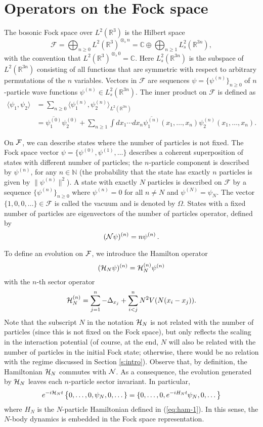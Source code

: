 \documentclass[11pt,a4paper]{article}
\newcommand{\bN}{{\mathbb N}}
\newcommand{\cF}{{\cal F}}
\newcommand{\cH}{{\cal H}}
\newcommand{\cN}{{\cal N}}
\newcommand{\R}{\mathbb{R}}
\begin{document}
\section{Operators on the Fock space}
\label{sec:fock}

The bosonic Fock space over $L^2(\R^3)$ is the Hilbert space
\[
  \mathcal{F} = \bigoplus_{n \ge 0} L^2(\R^3)^{\otimes_s n} = \mathbb{C}
  \oplus \bigoplus_{n \ge 1} L^2_s(\R^{3n}),
\]
with the convention that $L^2(\R^3)^{\otimes_s 0} = \mathbb{C}$. Here
$L^2_s (\R^{3n})$ is the subspace of $L^2(\R^{3n})$ consisting of all functions
that are symmetric with respect to arbitrary permutations of the $n$
variables. Vectors in $\mathcal{F}$ are sequences $\psi = \{\psi^{(n)}\}_{n
\ge 0}$ of $n$-particle wave functions $\psi^{(n)} \in L^2_s(\R^{3n})$. The
inner product on $\mathcal{F}$ is defined as
\begin{align*}
  \langle \psi_1, \psi_2 \rangle & = \sum_{n \ge 0} \langle \psi_1^{(n)},
  \psi_2^{(n)} \rangle_{L^2(\R^{3n})} \\
  & = \overline{\psi_1^{(0)}} \psi_2^{(0)} + \sum_{n \ge 1} \int dx_1 \cdots
  dx_n \overline{\psi_1^{(n)}}(x_1, \dots, x_n) \psi_2^{(n)}(x_1, \dots, x_n).
\end{align*}

On $\cF$, we can describe states where the number of particles is not fixed. The Fock space 
vector $\psi = \{ \psi^{(0)}, \psi^{(1)}, \dots  \}$ describes a coherent superposition 
of states with different number of particles; the $n$-particle component is described by $\psi^{(n)}$, for any $n \in \bN$ (the probability that the state has exactly $n$ particles is given by $\| \psi^{(n)} \|^2$).  
A state with exactly $N$ particles is described on
$\mathcal{F}$ by a sequence $\{\psi^{(n)}\}_{n \ge 0}$ where $\psi^{(n)} =
0$ for all $n \neq N$ and $\psi^{(N)} = \psi_N$. The vector $\{1, 0, 0, \dots
\} \in \mathcal{F}$ is called the vacuum and is denoted by $\Omega$.
States with a fixed number of particles are eigenvectors of the number of particles operator, defined by
\[ (\cN \psi)^{(n)} = n \psi^{(n)} \, . \]

To define an evolution on $\cF$, we introduce the Hamilton operator 
\[ (\cH_N \psi)^{(n)} = \cH_N^{(n)} \psi^{(n)} \]
with the $n$-th sector operator 
\[ \cH_N^{(n)} = \sum_{j=1}^n -\Delta_{x_j} + \sum_{i<j}^n N^2 V(N (x_i - x_j)). \]
Note that the subscript $N$ in the notation $\cH_N$ is not related with the number of particles (since this is not fixed on the Fock space), but only reflects the scaling in the interaction potential (of course, at the end, $N$ will also be related with the number of particles in the initial Fock state; otherwise, there would be no relation with the regime discussed in Section \ref{s:intro}). Observe that, by definition, the Hamiltonian $\cH_N$ commutes with $\cN$. As a consequence, the evolution generated by $\cH_N$ leaves each $n$-particle sector invariant. In particular, 
\[ e^{-i\cH_N t}  \left\{ 0, \dots , 0, \psi_N , 0 ,\dots \} = \{ 0, \dots, 0, e^{-iH_N t} \psi_N , 0 ,\dots \right\} \]
where $H_N$ is the $N$-particle Hamiltonian defined in (\ref{eq:ham-1}). In this sense, the $N$-body dynamics is embedded in the Fock space representation. 
\end{document}
